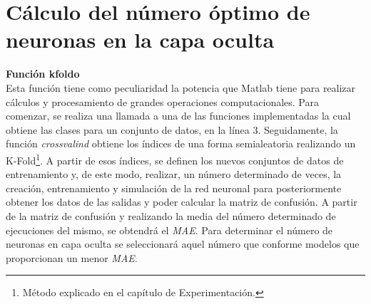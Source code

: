 	\section{Cálculo del número óptimo de neuronas en la capa oculta}
		
		\textbf{Función kfoldo}\\
		
		Esta función tiene como peculiaridad la potencia que Matlab tiene para realizar cálculos y procesamiento de grandes operaciones computacionales. Para comenzar, se realiza una llamada a una de las funciones implementadas la cual obtiene las clases para un conjunto de datos, en la línea 3. Seguidamente, la función \textit{crossvalind} obtiene los índices de una forma semialeatoria realizando un K-Fold\footnote{Método explicado en el capítulo de Experimentación.}. A partir de esos índices, se definen los nuevos conjuntos de datos de entrenamiento y, de este modo, realizar, un número determinado de veces, la creación, entrenamiento y simulación de la red neuronal para posteriormente obtener los datos de las salidas y poder calcular la matriz de confusión. A partir de la matriz de confusión y realizando la media del número determinado de ejecuciones del mismo, se obtendrá el \textit{MAE}. Para determinar el número de neuronas en capa oculta se seleccionará aquel número que conforme modelos que proporcionan un menor \textit{MAE}.\\
		
		

